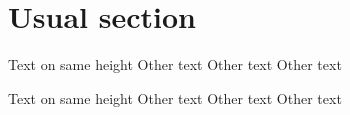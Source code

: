 \documentclass{kapital}
\begin{document}
  \tableofcontents*
  \mainmatter

  \section{Usual section}

  Text on same height
  \clearpage
  Other text
    \clearpage
  Other text
    \clearpage
  Other text


  \noindent{}Text on same height
  \clearpage
  Other text
    \clearpage
  Other text
    \clearpage
  Other text








\end{document}
